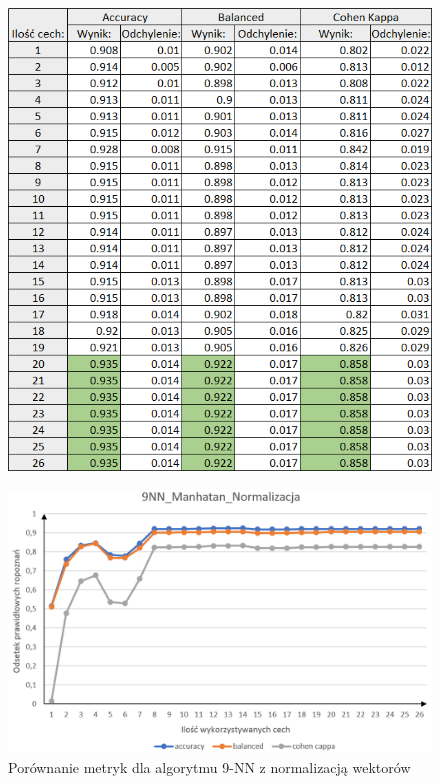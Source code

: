 \documentclass[12pt]{article}
\begin{document}
\begin{figure}[H]
	\centering
	\label{metryki_manhatan_bnorm_tab}
		\includegraphics[scale=0.9]{images/metrics/9nn_manhatan_beznorm_tab.png}
	
\end{figure}
\begin{figure}[H]
	\centering
		\includegraphics[scale=0.66]{images/metrics/9nn_manhatan_norm.png}
	\caption{Porównanie metryk dla algorytmu 9-NN z normalizacją wektorów}
	\label{metryki_manhatan_norm_wyk}
\end{figure}
\end{document}
